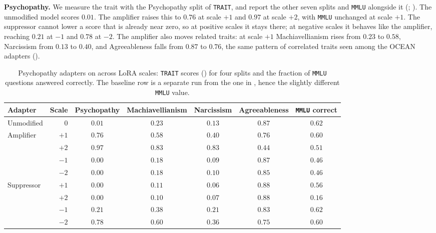 \textbf{Psychopathy.} We measure the trait with the Psychopathy split of \texttt{TRAIT}, and report the other seven splits and \texttt{MMLU} alongside it (; ). The unmodified model scores $0.01$. The amplifier raises this to $0.76$ at scale $+1$ and $0.97$ at scale $+2$, with \texttt{MMLU} unchanged at scale $+1$. The suppressor cannot lower a score that is already near zero, so at positive scales it stays there; at negative scales it behaves like the amplifier, reaching $0.21$ at $-1$ and $0.78$ at $-2$. The amplifier also moves related traits: at scale $+1$ Machiavellianism rises from $0.23$ to $0.58$, Narcissism from $0.13$ to $0.40$, and Agreeableness falls from $0.87$ to $0.76$, the same pattern of correlated traits seen among the OCEAN adapters ().

\begin{table}[htbp]
\centering
\caption{Psychopathy adapters on \LlamaThreePointOneSizeEightBInstruct{} across LoRA scales: \texttt{TRAIT} scores () for four splits and the fraction of \texttt{MMLU} questions answered correctly. The baseline row is a separate run from the one in , hence the slightly different \texttt{MMLU} value.}
\label{tab:beyond-ocean-psyc}
\small
\setlength{\tabcolsep}{5pt}
\begin{tabular}{l r cccc c}
\toprule
Adapter & Scale & Psychopathy & Machiavellianism & Narcissism & Agreeableness & \texttt{MMLU} correct \\
\midrule
Unmodified & $0$  & $0.01$ & $0.23$ & $0.13$ & $0.87$ & $0.62$ \\
\midrule
Amplifier  & $+1$ & $0.76$ & $0.58$ & $0.40$ & $0.76$ & $0.60$ \\
           & $+2$ & $0.97$ & $0.83$ & $0.83$ & $0.44$ & $0.51$ \\
           & $-1$ & $0.00$ & $0.18$ & $0.09$ & $0.87$ & $0.46$ \\
           & $-2$ & $0.00$ & $0.18$ & $0.10$ & $0.85$ & $0.46$ \\
\midrule
Suppressor & $+1$ & $0.00$ & $0.11$ & $0.06$ & $0.88$ & $0.56$ \\
           & $+2$ & $0.00$ & $0.10$ & $0.07$ & $0.88$ & $0.16$ \\
           & $-1$ & $0.21$ & $0.38$ & $0.21$ & $0.83$ & $0.62$ \\
           & $-2$ & $0.78$ & $0.60$ & $0.36$ & $0.75$ & $0.60$ \\
\bottomrule
\end{tabular}
\end{table}

